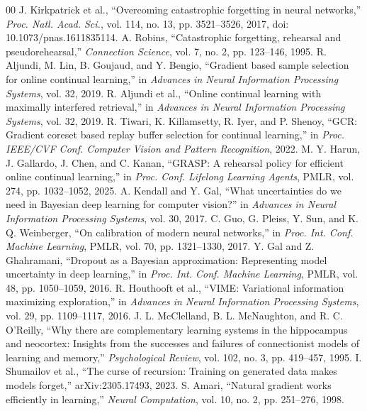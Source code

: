 \documentclass[conference]{IEEEtran}
\begin{document}
\begin{thebibliography}{00}
 J. Kirkpatrick et al., ``Overcoming catastrophic forgetting in neural networks,'' \emph{Proc. Natl. Acad. Sci.}, vol. 114, no. 13, pp. 3521--3526, 2017, doi: 10.1073/pnas.1611835114.
 A. Robins, ``Catastrophic forgetting, rehearsal and pseudorehearsal,'' \emph{Connection Science}, vol. 7, no. 2, pp. 123--146, 1995.
 R. Aljundi, M. Lin, B. Goujaud, and Y. Bengio, ``Gradient based sample selection for online continual learning,'' in \emph{Advances in Neural Information Processing Systems}, vol. 32, 2019.
 R. Aljundi et al., ``Online continual learning with maximally interfered retrieval,'' in \emph{Advances in Neural Information Processing Systems}, vol. 32, 2019.
 R. Tiwari, K. Killamsetty, R. Iyer, and P. Shenoy, ``GCR: Gradient coreset based replay buffer selection for continual learning,'' in \emph{Proc. IEEE/CVF Conf. Computer Vision and Pattern Recognition}, 2022.
 M. Y. Harun, J. Gallardo, J. Chen, and C. Kanan, ``GRASP: A rehearsal policy for efficient online continual learning,'' in \emph{Proc. Conf. Lifelong Learning Agents}, PMLR, vol. 274, pp. 1032--1052, 2025.
 A. Kendall and Y. Gal, ``What uncertainties do we need in Bayesian deep learning for computer vision?'' in \emph{Advances in Neural Information Processing Systems}, vol. 30, 2017.
 C. Guo, G. Pleiss, Y. Sun, and K. Q. Weinberger, ``On calibration of modern neural networks,'' in \emph{Proc. Int. Conf. Machine Learning}, PMLR, vol. 70, pp. 1321--1330, 2017.
 Y. Gal and Z. Ghahramani, ``Dropout as a Bayesian approximation: Representing model uncertainty in deep learning,'' in \emph{Proc. Int. Conf. Machine Learning}, PMLR, vol. 48, pp. 1050--1059, 2016.
 R. Houthooft et al., ``VIME: Variational information maximizing exploration,'' in \emph{Advances in Neural Information Processing Systems}, vol. 29, pp. 1109--1117, 2016.
 J. L. McClelland, B. L. McNaughton, and R. C. O'Reilly, ``Why there are complementary learning systems in the hippocampus and neocortex: Insights from the successes and failures of connectionist models of learning and memory,'' \emph{Psychological Review}, vol. 102, no. 3, pp. 419--457, 1995.
 I. Shumailov et al., ``The curse of recursion: Training on generated data makes models forget,'' arXiv:2305.17493, 2023.
 S. Amari, ``Natural gradient works efficiently in learning,'' \emph{Neural Computation}, vol. 10, no. 2, pp. 251--276, 1998.

\end{thebibliography}
\end{document}
